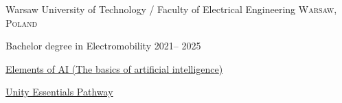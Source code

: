 \documentclass[10pt,a4paper]{article} %
\begin{document}



\spacedhrule{-0.2em}{-0.4em} %



\headedsection %
{Warsaw University of Technology / Faculty of Electrical Engineering}
{\textsc{Warsaw, Poland}} {

\headedsubsection %
{Bachelor degree in Electromobility}
{2021-- 2025}
{}
}

\spacedhrule{0.5em}{-0.4em} %


\headedsubsection %
{\href{https://certificates.mooc.fi/validate/1maqk140qk4L}
{Elements of AI (The basics of artificial intelligence)}}
{}

\headedsubsection %
{\href{https://www.credly.com/badges/af3440ab-a859-4927-a4ad-5df752dd7c4a/public_url}
{Unity Essentials Pathway}}
{}

\spacedhrule{0.8em}{-0.4em} %
\end{document}
